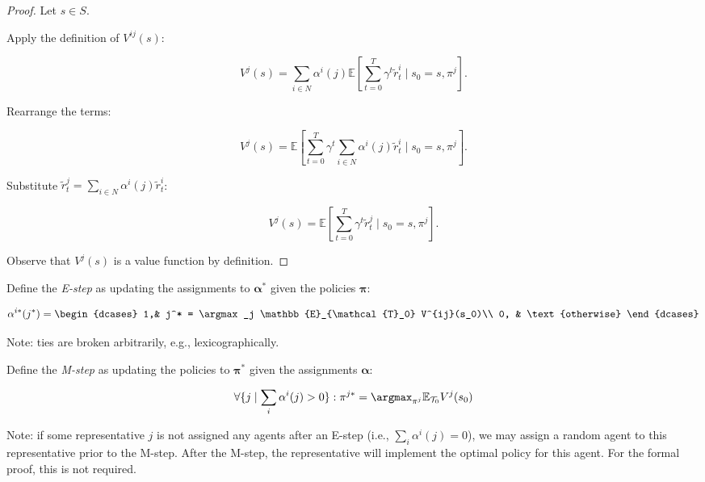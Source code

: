 \begin{proof}
    Let $s \in S$.
    
    Apply the definition of $V^{ij}(s)$:
    
    $$
    V^j(s) = \sum_{i \in N} \alpha^i(j) \mathbb{E} \left[ \overset{T}{\underset{t=0}{\sum}} \gamma^{t} \tilde{r}^i_t \mid s_0 = s, \pi^j \right].
    $$

    Rearrange the terms:

    $$
    V^j(s) = \mathbb{E} \left[ \overset{T}{\underset{t=0}{\sum}} \gamma^{t} \sum_{i \in N} \alpha^i(j) \tilde{r}^i_t \mid s_0 = s, \pi^j \right].
    $$

    Substitute $\tilde{r}^j_t = \sum_{i \in N} \alpha^i(j) \tilde{r}^i_t$:

    $$
    V^j(s) = \mathbb{E} \left[ \overset{T}{\underset{t=0}{\sum}} \gamma^{t} \tilde{r}^j_t \mid s_0 = s, \pi^j \right].
    $$

    Observe that $V^j(s)$ is a value function by definition.
\end{proof}



Define the \textit{E-step} as updating the assignments to $\boldsymbol\alpha^*$ given the policies $\boldsymbol\pi$:

\begin{equation}
    \alpha^{i*}(j^*) = 
    \begin{dcases}
        1,& j^* = \argmax_j \mathbb{E}_{\mathcal{T}_0} V^{ij}(s_0)\\
        0,              & \text{otherwise}
    \end{dcases}
\end{equation}

\noindent Note: ties are broken arbitrarily, e.g., lexicographically.


Define the \textit{M-step} as updating the policies to $\boldsymbol\pi^*$ given the assignments $\boldsymbol\alpha$:

\begin{equation}
   \forall \{ j \mid \sum_i \alpha^i(j) > 0 \} : \pi^{j*} = \argmax_{\pi^j} \mathbb{E}_{\mathcal{T}_0} V^j(s_0)
\end{equation}

\noindent Note: if some representative $j$ is not assigned any agents after an E-step (i.e., $\sum_i \alpha^i(j) = 0$), we may assign a random agent to this representative prior to the M-step. After the M-step, the representative will implement the optimal policy for this agent. For the formal proof, this is not required.


